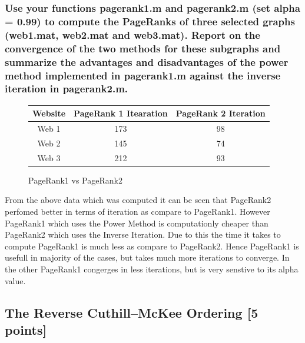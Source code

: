\documentclass[unicode,11pt,a4paper,oneside,numbers=endperiod,openany]{scrartcl}
\begin{document}
\subsubsection{Use your functions pagerank1.m and pagerank2.m (set alpha = 0.99) to compute the PageRanks of three selected graphs (web1.mat, web2.mat and web3.mat). Report on the convergence of the two methods
    for these subgraphs and summarize the advantages and disadvantages of the power method implemented in
    pagerank1.m against the inverse iteration in pagerank2.m.}
\begin{figure}[H]
    \centering
    \begin{tabular}{|c|c|c|}
        \hline
        Website & PageRank 1 Itearation & PageRank 2 Iteration \\
        \hline
        Web 1   & 173                   & 98                   \\
        Web 2   & 145                   & 74                   \\
        Web 3   & 212                   & 93                   \\
        \hline
    \end{tabular}
    \caption{PageRank1 vs PageRank2}
\end{figure}

From the above data which was computed it can be seen that PageRank2 perfomed better in terms of iteration as compare to PageRank1. However PageRank1 which uses the Power Method is computationly cheaper than PageRank2 which uses the Inverse Iteration. Due to this the time it takes to compute PageRank1 is much less as compare to PageRank2. Hence PageRank1 is usefull in majority of the cases, but takes much more iterations to converge. In the other PageRank1 congerges in less iterations, but is very senstive to its alpha value. \\

\subsection{The Reverse Cuthill--McKee Ordering [5 points]}
\end{document}
